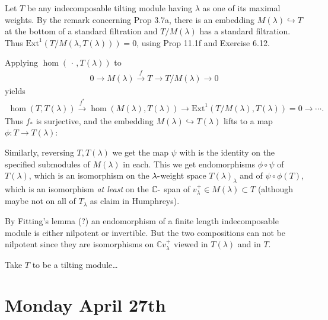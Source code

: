 \documentclass[11pt]{scrartcl}
\theoremstyle{definition}
\theoremstyle{theorem}
\theoremstyle{proof}
\newenvironment{proof}
{\pushQED{$\qed$}\pf}
{\par\popQED\endpf}
\theoremstyle{definition}
\theoremstyle{break}
\theoremstyle{problem}
\newcommand{\CC}[0]{{\mathbb{C}}}
\newcommand{\ext}[0]{\text{Ext}}
\newcommand{\dash}[0]{{\hbox{-}}}
\newcommand{\injects}[0]{\hookrightarrow}
\newcommand{\mapsvia}[1]{\xrightarrow{#1}}
\newcommand{\wait}[0]{{\,\cdot\,}}
\renewcommand{\qed}[0]{\hfill\blacksquare}
\renewcommand{\to}[0]{\longrightarrow}
\begin{document}
\begin{proof}[of (b)]

Let \(T\) be any indecomposable tilting module having \(\lambda\) as one
of its maximal weights. By the remark concerning Prop 3.7a, there is an
embedding \(M(\lambda) \injects T\) at the bottom of a standard
filtration and \(T/M(\lambda)\) has a standard filtration. Thus
\(\ext^1(T/M(\lambda, T(\lambda))) = 0\), using Prop 11.1f and Exercise
6.12.

Applying \(\hom(\wait, T(\lambda))\) to
\begin{align*}0 \to M(\lambda) \mapsvia{f} T \to T/M(\lambda) \to 0\end{align*}
yields
\begin{align*}\hom(T, T(\lambda)) \mapsvia{f^*} \hom(M(\lambda), T(\lambda)) \to \ext^1(T/M(\lambda), T(\lambda)) = 0 \to \cdots.\end{align*}
Thus \(f_*\) is surjective, and the embedding
\(M(\lambda) \injects T(\lambda)\) lifts to a map
\(\phi: T\to T(\lambda)\):

\begin{center}
\end{center}

Similarly, reversing \(T, T(\lambda)\) we get the map \(\psi\) with is
the identity on the specified submodules of \(M(\lambda)\) in each. This
we get endomorphisms \(\phi \circ \psi\) of \(T(\lambda)\), which is an
isomorphism on the \(\lambda\dash\)weight space \(T(\lambda)_\lambda\)
and of \(\psi\circ \phi(T)\), which is an isomorphism \emph{at least} on
the \(\CC\dash\) span of \(v_\lambda^+ \in M(\lambda) \subset T\)
(although maybe not on all of \(T_\lambda\) as claim in Humphreys).

By Fitting's lemma (?) an endomorphism of a finite length indecomposable
module is either nilpotent or invertible. But the two compositions can
not be nilpotent since they are isomorphisms on \(\CC v_\lambda^+\)
viewed in \(T(\lambda)\) and in \(T\).\end{proof}

\begin{proof}[of (c)]

Take \(T\) to be a tilting module\ldots{}\end{proof}

\hypertarget{monday-april-27th}{%
\section{Monday April 27th}\label{monday-april-27th}}
\end{document}
